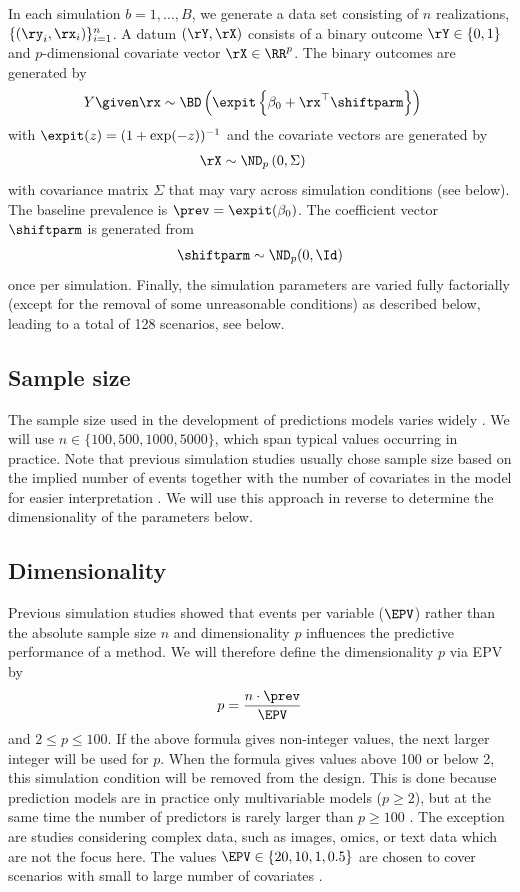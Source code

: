 \begin{subappendices}
In each simulation $b = 1, \dots, B$, we generate a data set consisting of $n$
realizations, \ie $\{(\ry_i, \rx_i)\}_{i=1}^n$. A datum $(\rY, \rX)$ consists of
a binary outcome $\rY \in \{0, 1\}$ and $p$-dimensional covariate vector
$\rX \in \RR^p$. The binary outcomes are generated by
\begin{align*}
  Y \given \rx &\sim \BD\left(\expit\left\{\beta_0 +
	\rx^\top\shiftparm\right\}\right)
\end{align*}
with $\expit(z) = (1 + \exp(-z))^{-1}$ and the covariate vectors are generated
by
\begin{align*}
  \rX &\sim \ND_p\left(0, \Sigma\right)
\end{align*}
with covariance matrix $\Sigma$ that may vary across simulation conditions (see
below). The baseline prevalence is $\prev = \expit(\beta_0)$. The coefficient
vector $\shiftparm$ is generated from
\begin{align*}
  \shiftparm \sim \ND_p(0, \Id)
\end{align*}
once per simulation. Finally, the simulation parameters are varied fully
factorially (except for the removal of some unreasonable conditions) as
described below, leading to a total of 128 scenarios, see below.

\subsection*{Sample size}
The sample size used in the development of predictions models varies widely
\citep{Damen2016}. We will use $n \in \{100, 500, 1000, 5000\}$, which span
typical values occurring in practice. Note that previous simulation studies
usually chose sample size based on the implied number of events together with
the number of covariates in the model for easier interpretation
\citep{vanSmeden2018, Riley2018}. We will use this approach in reverse to
determine the dimensionality of the parameters below.

\subsection*{Dimensionality}
Previous simulation studies showed that events per variable ($\EPV$) rather than
the absolute sample size $n$ and dimensionality $p$ influences the predictive
performance of a method. We will therefore define the dimensionality $p$ via EPV
by $$p = \frac{n \cdot \prev}{\EPV}$$ and $2 \leq p \leq 100.$ If the above
formula gives non-integer values, the next larger integer will be used for $p$.
When the formula gives values above 100 or below 2, this simulation condition
will be removed from the design. This is done because prediction models are in
practice only multivariable models ($p \geq 2$), but at the same time the number
of predictors is rarely larger than $p \geq 100$
\citep{Kreuzberger2020,Seker2020, Wynants2020}. The exception are studies
considering complex data, such as images, omics, or text data which are not the
focus here. The values $\EPV \in \{20, 10, 1, 0.5\}$ are chosen to cover
scenarios with small to large number of covariates \citep[see][]{vanSmeden2018}.



\end{subappendices}
